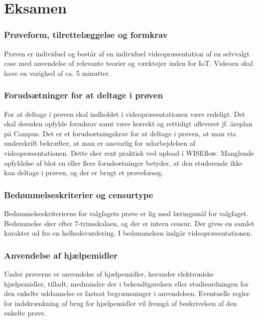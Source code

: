 \chapter{Eksamen}
\subsection*{Prøveform, tilrettelæggelse og formkrav}
Prøven er individuel og består af en individuel videopræsentation af en selvvalgt case med anvendelse af relevante teorier og værktøjer inden for IoT. Videoen skal have en varighed af ca. 5 minutter.

\subsection*{Forudsætninger for at deltage i prøven}
For at deltage i prøven skal indholdet i videopræsentationen være redeligt. Det skal desuden opfylde formkrav samt være korrekt og rettidigt afleveret jf. årsplan på Campus.
\newline\newline\noindent
Det er et forudsætningskrav for at deltage i prøven, at man via underskrift bekræfter, at man er ansvarlig for udarbejdelsen af videopræsentationen. Dette sker rent praktisk ved upload i WISEflow.
\newline\newline\noindent
Manglende opfyldelse af blot en eller flere forudsætninger betyder, at den studerende ikke kan deltage i prøven, og der er brugt et prøveforsøg.

\subsection*{Bedømmelseskriterier og censurtype}
Bedømmelseskriterierne for valgfagets prøve er lig med læringsmål for valgfaget. Bedømmelse sker efter 7-trinsskalaen, og der er intern censur. Der gives en samlet karakter ud fra en helhedsvurdering. I bedømmelsen indgår videopræsentationen.

\subsection*{Anvendelse af hjælpemidler}
Under prøverne er anvendelse af hjælpemidler, herunder elektroniske hjælpemidler, tilladt, medmindre der i bekendtgørelsen eller studieordningen for den enkelte uddannelse er fastsat begrænsninger i anvendelsen.
\newline\newline\noindent
Eventuelle regler for indskrænkning af brug for hjælpemidler vil fremgå af beskrivelsen af den enkelte prøve.

